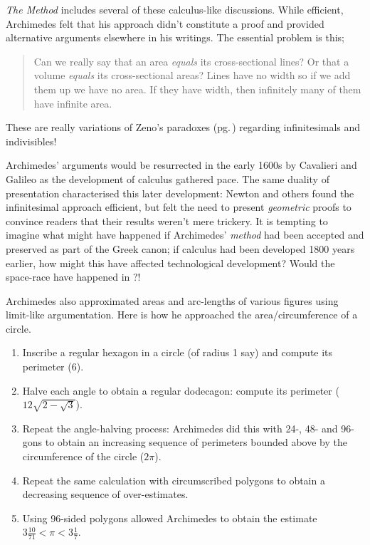 \emph{The Method} includes several of these calculus-like discussions. While efficient, Archimedes felt that his approach didn't constitute a proof and provided alternative arguments elsewhere in his writings. The essential problem is this;
\begin{quote}
  Can we really say that an area \emph{equals} its cross-sectional lines? Or that a volume \emph{equals} its cross-sectional areas? Lines have no width so if we add them up we have no area. If they have width, then infinitely many of them have infinite area.
\end{quote}
These are really variations of Zeno's paradoxes (pg.\,\pageref{pg:zeno}) regarding infinitesimals and indivisibles!
\goodbreak

Archimedes' arguments would be resurrected in the early 1600s by Cavalieri and Galileo as the development of calculus gathered pace. The same duality of presentation characterised this later development: Newton and others found the infinitesimal approach efficient, but felt the need to present \emph{geometric} proofs to convince readers that their results weren't mere trickery.\smallbreak
It is tempting to imagine what might have happened if Archimedes' \emph{method} had been accepted and preserved as part of the Greek canon; if calculus had been developed 1800 years earlier, how might this have affected technological development? Would the space-race have happened in ?! %


 Archimedes also approximated areas and arc-lengths of various figures using limit-like argumentation. Here is how he approached the area/circumference of a circle.\label{pg:archquadcircle}

\begin{enumerate}\itemsep0pt
  \item Inscribe a regular hexagon in a circle (of radius 1 say) and compute its perimeter ($6$).
  \item Halve each angle to obtain a regular dodecagon: compute its perimeter ($12\sqrt{2-\sqrt 3}$).
  \item Repeat the angle-halving process: Archimedes did this with 24-, 48- and 96-gons to obtain an increasing sequence of perimeters bounded above by the circumference of the circle ($2\pi$).
  \item Repeat the same calculation with circumscribed polygons to obtain a decreasing sequence of over-estimates.
  \item Using 96-sided polygons allowed Archimedes to obtain the estimate $3\frac{10}{71}<\pi<3\frac 17$.
\end{enumerate}

